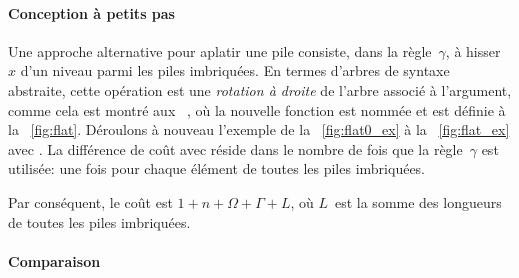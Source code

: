 \paragraph{Conception à petits pas}

Une approche alternative pour aplatir une pile consiste, dans la
règle~\(\gamma\), à hisser~\(x\) d'un niveau parmi les piles
imbriquées. En termes d'arbres de syntaxe abstraite, cette opération
est une \emph{rotation à droite} de
l'arbre associé à l'argument, comme cela est montré aux
\figs~, où la nouvelle fonction est
nommée  et est définie à la
\fig~\vref{fig:flat}. Déroulons à nouveau l'exemple de la
\fig~\vref{fig:flat0_ex} à la \fig~\vref{fig:flat_ex} avec
. La différence de coût avec
 réside dans le nombre
de fois que la règle~\(\gamma\) est utilisée: une fois pour chaque
élément de toutes les piles imbriquées.

Par conséquent, le coût
\label{cost_flat} est \(1 + n + \Omega
+ \Gamma + L\), où \(L\)~est la somme des longueurs de toutes les
piles imbriquées.

\paragraph{Comparaison}

